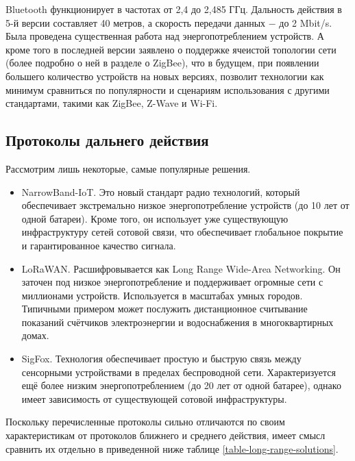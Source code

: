    Bluetooth функционирует в частотах от 2,4 до 2,485 ГГц. Дальность действия в 5-й версии составляет 40 метров,
    а скорость передачи данных $-$ до 2 Mbit/s. Была проведена существенная работа над энергопотреблением 
    устройств. А кроме того в последней версии заявлено о поддержке ячеистой топологии сети (более подробно
    о ней в разделе о ZigBee), что в будущем, при появлении большего количество устройств на новых версиях,
    позволит технологии как минимум сравниться по популярности и сценариям использования с другими
    стандартами, такими как ZigBee, Z-Wave и Wi-Fi.
    
    
    \subsection{Протоколы дальнего действия}
    
   	Рассмотрим лишь некоторые, самые популярные решения.
   	
   	\begin{itemize}
   		\item NarrowBand-IoT. Это новый стандарт радио технологий, который обеспечивает экстремально
   		низкое энергопотребление устройств (до 10 лет от одной батареи). Кроме того, он использует уже
   		существующую инфраструктуру сетей сотовой связи, что обеспечивает глобальное покрытие и
   		гарантированное качество сигнала.
   		\item LoRaWAN. Расшифровывается как Long Range Wide-Area Networking. Он заточен под
   		низкое энергопотребление и поддерживает огромные сети с миллионами устройств. Используется
   		в масштабах умных городов. Типичными примером может послужить дистанционное считывание 
   		показаний счётчиков электроэнергии и водоснабжения в многоквартирных домах.
   		\item SigFox. Технология обеспечивает простую и быструю связь между сенсорными устройствами 
   		в пределах беспроводной сети. Характеризуется ещё более низким энергопотреблением (до 20 лет
   		от одной батарее), однако имеет зависимость от существующей сотовой инфраструктуры.
   	\end{itemize}
   
   Поскольку перечисленные протоколы сильно отличаются по своим характеристикам от протоколов 
   ближнего и среднего действия, имеет смысл сравнить их отдельно в приведенной ниже таблице \ref{table-long-range-solutions}.
   
